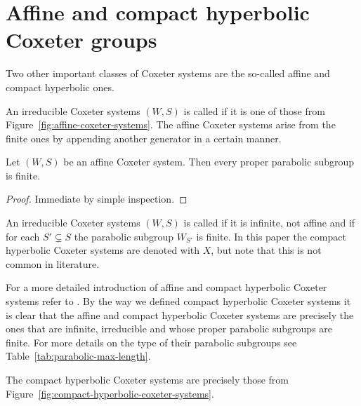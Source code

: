 \section{Affine and compact hyperbolic Coxeter groups}
\label{sec:coxeter-groups-affine-compact-hyperbolic}

Two other important classes of Coxeter systems are the so-called affine and compact hyperbolic ones.

\begin{defi}
	An irreducible Coxeter systems $(W,S)$ is called  if it is one of those from Figure~\ref{fig:affine-coxeter-systems}. The affine Coxeter systems arise from the finite ones by appending another generator in a certain manner.
\end{defi}

\begin{prop}
	Let $(W,S)$ be an affine Coxeter system. Then every proper parabolic subgroup is finite.

	\begin{proof}
		Immediate by simple inspection.
	\end{proof}
\end{prop}

\begin{defi}
	An irreducible Coxeter systems $(W,S)$ is called  if it is infinite, not affine and if for each $S' \subsetneq S$ the parabolic subgroup $W_{S'}$ is finite. In this paper the compact hyperbolic Coxeter systems are denoted with $X$, but note that this is not common in literature.
\end{defi}

For a more detailed introduction of affine and compact hyperbolic Coxeter systems refer to \cite[Section 2.5, 6.7 -- 6.9]{humphreys:coxeter}. By the way we defined compact hyperbolic Coxeter systems it is clear that the affine and compact hyperbolic Coxeter systems are precisely the ones that are infinite, irreducible and whose proper parabolic subgroups are finite. For more details on the type of their parabolic subgroups see Table~\ref{tab:parabolic-max-length}.

\begin{theo}
	The compact hyperbolic Coxeter systems are precisely those from Figure~\ref{fig:compact-hyperbolic-coxeter-systems}.
\end{theo}


